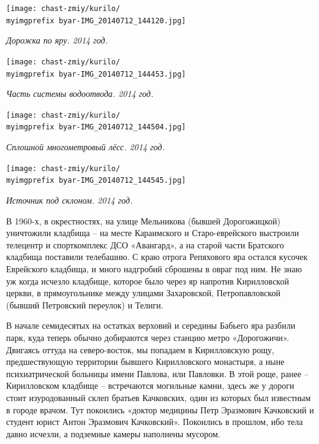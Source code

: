 \begin{center}
\texttt{[image: chast-zmiy/kurilo/\\myimgprefix byar-IMG\_20140712\_144120.jpg]}

\textit{Дорожка по яру. 2014 год.}
\end{center}

\begin{center}
\texttt{[image: chast-zmiy/kurilo/\\myimgprefix byar-IMG\_20140712\_144453.jpg]}

\textit{Часть системы водоотвода. 2014 год.}
\end{center}


\begin{center}
\texttt{[image: chast-zmiy/kurilo/\\myimgprefix byar-IMG\_20140712\_144504.jpg]}

\textit{Сплошной многометровый лёсс. 2014 год.}
\end{center}

\begin{center}
\texttt{[image: chast-zmiy/kurilo/\\myimgprefix byar-IMG\_20140712\_144545.jpg]}

\textit{Источник под склоном. 2014 год.}
\end{center}

В 1960-х, в окрестностях, на улице Мельникова (бывшей Дорогожицкой) уничтожили кладбища – на месте Караимского и Старо-еврейского выстроили телецентр и спорткомплекс ДСО «Авангард», а на старой части Братского кладбища поставили телебашню. С краю отрога Репяхового яра остался кусочек Еврейского кладбища, и много надгробий сброшены в овраг под ним. Не знаю уж когда исчезло кладбище, которое было через яр напротив Кирилловской церкви, в прямоугольнике между улицами Захаровской, Петропавловской (бывший Петровский переулок) и Телиги.

В начале семидесятых на остатках верховий и середины Бабьего яра разбили парк, куда теперь обычно добираются через станцию метро «Дорогожичи». Двигаясь оттуда на северо-восток, мы попадаем в Кирилловскую рощу, предшествующую территории бывшего Кирилловского монастыря, а ныне психиатрической больницы имени Павлова, или Павловки. В этой роще, ранее – Кирилловском кладбище – встречаются могильные камни, здесь же у дороги стоит изуродованный склеп братьев Качковских, один из которых был известным в городе врачом. Тут покоились «доктор медицины Петр Эразмович Качковский и студент юрист Антон Эразмович Качковский». Покоились в прошлом, ибо тела давно исчезли, а подземные камеры наполнены мусором.

